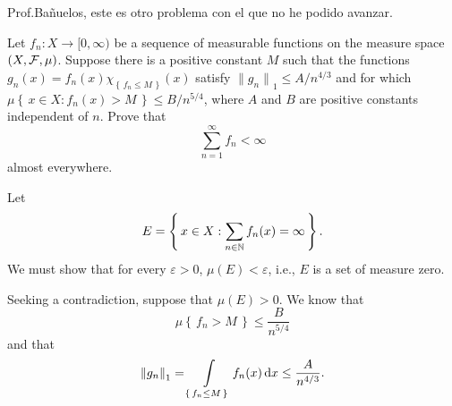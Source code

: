 \documentclass[12pt,twoside]{article}
\renewcommand*{\thefootnote}{\fnsymbol{footnote}}
\begin{document}
\renewcommand*{\thefootnote}{\fnsymbol{footnote}}

\thispagestyle{empty}
\author{\href{mailto:\email}{\auth}}
\title{\tight}
\date{\today}
\maketitle

Prof.\@ Bañuelos, este es otro problema con el que no he podido avanzar.
\begin{problem}
  Let $f_n\colon X\to[0,\infty)$ be a sequence of measurable functions on
  the measure space $(X,\mathcal{F},\mu)$. Suppose there is a positive constant
  $M$ such that the functions
  $g_n(x)=f_n (x)\chi_{\left\{\,f_n\leq M\,\right\}}(x)$ satisfy
  ${\|g_n\|}_1\leq A/n^{4/3}$ and for which
  $\mu\left\{\,x\in X:f_n(x)>M\,\right\}\leq B/n^{5/4}$, where $A$ and $B$
  are positive constants independent of $n$. Prove that
  \[
    \sum_{n=1}^\infty f_n<\infty
  \]
  almost everywhere.
\end{problem}
\begin{solution}
  Let
  \[
    E=\left\{\,x\in X:\sum_{n\in\mathbb{N}} f_n(x)=\infty\,\right\}.
  \]
  We must show that for every $\varepsilon>0$, $\mu(E)<\varepsilon$, i.e.,
  $E$ is a set of measure zero.

  Seeking a contradiction, suppose that $\mu(E)>0$. We know that
  \[
    \mu\left\{\,f_n>M\,\right\}\leq\frac{B}{n^{5/4}}
  \]
  and that
  \[
    {\|g_n\|}_1=\int\limits_{\left\{\,f_n\leq M\,\right\}}
    f_n(x)\mathop{}\!\mathrm{d} x\leq\frac{A}{n^{4/3}}.
  \]
\end{solution}
\end{document}
